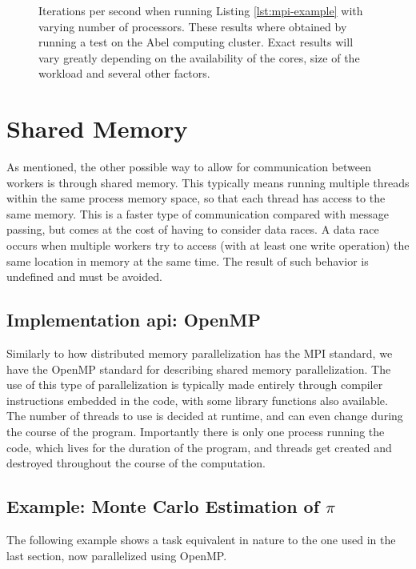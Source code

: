 \documentclass[Thesis.tex]{subfiles}
\begin{document}
\begin{figure}[h]
  \centering
    \resizebox{0.7\linewidth}{!}{%
        
    }
  \caption[Speedup using MPI parallelization]{Iterations per second when running
    Listing \ref{lst:mpi-example} with
varying number of processors. These results where obtained by running a test on
the Abel computing cluster. Exact results will vary greatly depending on the
availability of the cores, size of the workload and several other
factors.}
  \label{fig:mpi-example}
\end{figure}


\section{Shared Memory}

As mentioned, the other possible way to allow for communication between workers
is through shared memory. This typically means running multiple threads within
the same process memory space, so that each thread has access to the same
memory. This is a faster type of communication compared with message passing,
but comes at the cost of having to consider data races. A data race occurs when
multiple workers try to access (with at least one write operation) the same
location in memory at the same time. The result of such behavior is undefined
and must be avoided.

\subsection{Implementation \acrshort{api}: OpenMP}

Similarly to how distributed memory parallelization has the MPI standard, we
have the OpenMP standard for describing shared memory parallelization. The use
of this type of parallelization is typically made entirely through compiler
instructions embedded in the code, with some library functions also available.
The number of threads to use is decided at runtime, and can even change during
the course of the program. Importantly there is only one process running the
code, which lives for the duration of the program, and threads get
created and destroyed throughout the course of the computation.

\subsection{Example: Monte Carlo Estimation of $\pi$}
The following example shows a task equivalent in nature to
the one used in the last section, now parallelized using OpenMP.
\end{document}
